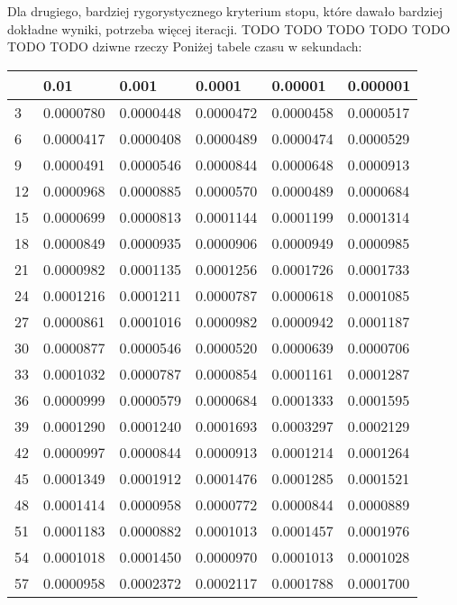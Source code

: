 \documentclass{article}
\begin{document}
Dla drugiego, bardziej rygorystycznego kryterium stopu, które dawało bardziej dokładne wyniki, potrzeba więcej iteracji.
TODO TODO TODO TODO TODO TODO TODO dziwne rzeczy
Poniżej tabele czasu w sekundach:

\begin{table}[H]
\centering
\begin{tabular}{|l|l|l|l|l|l|}
\hline
& 0.01 & 0.001 & 0.0001 & 0.00001 & 0.000001 \\ \hline
3 & 0.0000780 & 0.0000448 & 0.0000472 & 0.0000458 & 0.0000517 \\ \hline
6 & 0.0000417 & 0.0000408 & 0.0000489 & 0.0000474 & 0.0000529 \\ \hline
9 & 0.0000491 & 0.0000546 & 0.0000844 & 0.0000648 & 0.0000913 \\ \hline
12 & 0.0000968 & 0.0000885 & 0.0000570 & 0.0000489 & 0.0000684 \\ \hline
15 & 0.0000699 & 0.0000813 & 0.0001144 & 0.0001199 & 0.0001314 \\ \hline
18 & 0.0000849 & 0.0000935 & 0.0000906 & 0.0000949 & 0.0000985 \\ \hline
21 & 0.0000982 & 0.0001135 & 0.0001256 & 0.0001726 & 0.0001733 \\ \hline
24 & 0.0001216 & 0.0001211 & 0.0000787 & 0.0000618 & 0.0001085 \\ \hline
27 & 0.0000861 & 0.0001016 & 0.0000982 & 0.0000942 & 0.0001187 \\ \hline
30 & 0.0000877 & 0.0000546 & 0.0000520 & 0.0000639 & 0.0000706 \\ \hline
33 & 0.0001032 & 0.0000787 & 0.0000854 & 0.0001161 & 0.0001287 \\ \hline
36 & 0.0000999 & 0.0000579 & 0.0000684 & 0.0001333 & 0.0001595 \\ \hline
39 & 0.0001290 & 0.0001240 & 0.0001693 & 0.0003297 & 0.0002129 \\ \hline
42 & 0.0000997 & 0.0000844 & 0.0000913 & 0.0001214 & 0.0001264 \\ \hline
45 & 0.0001349 & 0.0001912 & 0.0001476 & 0.0001285 & 0.0001521 \\ \hline
48 & 0.0001414 & 0.0000958 & 0.0000772 & 0.0000844 & 0.0000889 \\ \hline
51 & 0.0001183 & 0.0000882 & 0.0001013 & 0.0001457 & 0.0001976 \\ \hline
54 & 0.0001018 & 0.0001450 & 0.0000970 & 0.0001013 & 0.0001028 \\ \hline
57 & 0.0000958 & 0.0002372 & 0.0002117 & 0.0001788 & 0.0001700 \\ \hline

\end{tabular}
\end{table}
\end{document}
